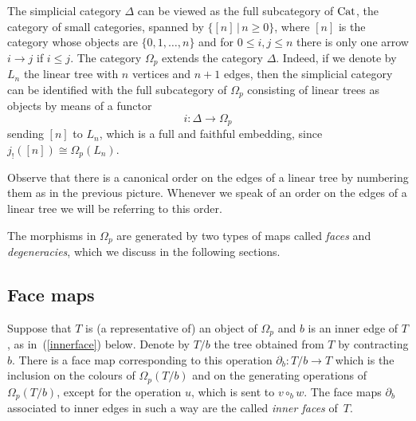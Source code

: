 \documentclass[a4paper]{amsart}
\theoremstyle{plain}
\theoremstyle{definition}
\theoremstyle{remark}
\newcommand{\rpd}{\Omega_p}
\newcommand{\To}{\longrightarrow}
\numberwithin{equation}{section}
\numberwithin{figure}{section}
\begin{document}
The simplicial category $\Delta$ can be viewed as the full
subcategory of ${\rm Cat}$, the category of small categories,
spanned by $\{[n]\,|\, n\ge 0\}$, where $[n]$ is the category whose
objects are $\{0,1,\ldots, n\}$ and for $0\le i,j\le n$ there is
only one arrow $i\longrightarrow j$ if $i\le j$. The category
$\Omega_p$ extends the category $\Delta$. Indeed, if we denote by
$L_n$ the linear tree with $n$ vertices and $n+1$ edges,
then the simplicial category can be identified with the full subcategory of $\rpd$ consisting of linear trees as objects
by means of a functor
\begin{equation}
    i\colon \Delta\longrightarrow \Omega_p
    \label{embedding of delta}
\end{equation}
sending $[n]$ to $L_n$, which is a full and faithful embedding, since $j_!([n])\cong\Omega_p(L_n)$.

Observe that there is a canonical order on the edges of a linear tree by numbering them as in the previous picture. Whenever we speak of an order on the edges of a linear tree we will be referring to this order.


The morphisms in $\rpd$ are generated by two types of maps called \emph{faces} and
\emph{degeneracies}, which we discuss in the following sections.

\subsection{Face maps} Suppose that $T$ is (a representative of) an object of $\rpd$ and
$b$ is an inner edge of $T$, as in~(\ref{innerface}) below. Denote by $T/b$ the tree obtained from $T$ by contracting
$b$. There is a face map corresponding to this operation $\partial_b:T/b\To T$ which is the inclusion on the colours of $\Omega_p(T/b)$
and on the generating operations of $\Omega_p(T/b)$, except for the operation  $u$, which is sent to $v\circ_b w$.
The face maps $\partial_b$ associated to inner edges in such a way are the called \emph{inner faces} of~$T$.
\end{document}
